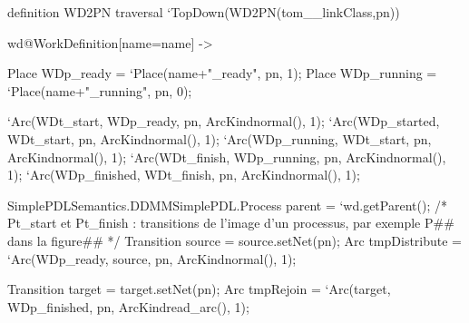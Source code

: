 %
\begin{tomcode3}[caption=\texttt{WD2PN :} Code de la définition \emph{WorkDefinitionToPetriNet},label=code:wd2pn]
definition WD2PN traversal `TopDown(WD2PN(tom__linkClass,pn)) {
  wd@WorkDefinition[name=name] -> {
    Place WDp_ready  = `Place(name+"_ready", pn, 1);
    Place WDp_running  = `Place(name+"_running", pn, 0);

    `Arc(WDt_start, WDp_ready, pn, ArcKindnormal(), 1);
    `Arc(WDp_started, WDt_start, pn, ArcKindnormal(), 1);
    `Arc(WDp_running, WDt_start, pn, ArcKindnormal(), 1);
    `Arc(WDt_finish, WDp_running, pn, ArcKindnormal(), 1);
    `Arc(WDp_finished, WDt_finish, pn, ArcKindnormal(), 1);

    SimplePDLSemantics.DDMMSimplePDL.Process parent = `wd.getParent();
    /* Pt_start et Pt_finish : transitions de l'image d'un processus, par 
    exemple P## dans la figure## */
    Transition source = %
    source.setNet(pn);
    Arc tmpDistribute = `Arc(WDp_ready, source, pn, ArcKindnormal(), 1);

    Transition target = %
    target.setNet(pn);
    Arc tmpRejoin = `Arc(target, WDp_finished, pn, ArcKindread_arc(), 1);
  }
}
\end{tomcode3}
